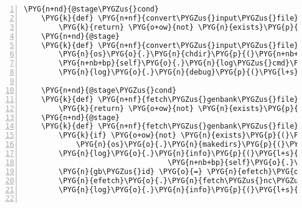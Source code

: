 \begin{Verbatim}[commandchars=\\\{\},numbers=left,firstnumber=1,stepnumber=5]
    \PYG{n+nd}{@stage\PYGZus{}cond}
    \PYG{k}{def} \PYG{n+nf}{convert\PYGZus{}input\PYGZus{}file}\PYG{p}{(}\PYG{n+nb+bp}{self}\PYG{p}{)}\PYG{p}{:}
        \PYG{k}{return} \PYG{o+ow}{not} \PYG{n}{exists}\PYG{p}{(}\PYG{n+nb+bp}{self}\PYG{o}{.}\PYG{n}{analysis}\PYG{o}{.}\PYG{n}{inputfile\PYGZus{}fq\PYGZus{}path}\PYG{p}{)}
    \PYG{n+nd}{@stage}
    \PYG{k}{def} \PYG{n+nf}{convert\PYGZus{}input\PYGZus{}file}\PYG{p}{(}\PYG{n+nb+bp}{self}\PYG{p}{)}\PYG{p}{:}
        \PYG{n}{os}\PYG{o}{.}\PYG{n}{chdir}\PYG{p}{(}\PYG{n+nb+bp}{self}\PYG{o}{.}\PYG{n}{analysis}\PYG{o}{.}\PYG{n}{input\PYGZus{}data\PYGZus{}dir}\PYG{p}{)}
        \PYG{n+nb+bp}{self}\PYG{o}{.}\PYG{n}{log\PYGZus{}cmd}\PYG{p}{(}\PYG{l+s}{"}\PYG{l+s}{fastq-dump}\PYG{l+s}{"}\PYG{p}{,} \PYG{l+s}{"}\PYG{l+s}{-B}\PYG{l+s}{"}\PYG{p}{,} \PYG{n+nb+bp}{self}\PYG{o}{.}\PYG{n}{analysis}\PYG{o}{.}\PYG{n}{inputfile\PYGZus{}name}\PYG{p}{)}
        \PYG{n}{log}\PYG{o}{.}\PYG{n}{debug}\PYG{p}{(}\PYG{l+s}{"}\PYG{l+s}{created }\PYG{l+s+si}{\PYGZpc{}s}\PYG{l+s}{"} \PYG{o}{\PYGZpc{}} \PYG{n+nb+bp}{self}\PYG{o}{.}\PYG{n}{analysis}\PYG{o}{.}\PYG{n}{inputfile\PYGZus{}fq\PYGZus{}path}\PYG{p}{)}

    \PYG{n+nd}{@stage\PYGZus{}cond}
    \PYG{k}{def} \PYG{n+nf}{fetch\PYGZus{}genbank\PYGZus{}file}\PYG{p}{(}\PYG{n+nb+bp}{self}\PYG{p}{)}\PYG{p}{:}
        \PYG{k}{return} \PYG{o+ow}{not} \PYG{n}{exists}\PYG{p}{(}\PYG{n+nb+bp}{self}\PYG{o}{.}\PYG{n}{analysis}\PYG{o}{.}\PYG{n}{genbankfile\PYGZus{}path}\PYG{p}{)}
    \PYG{n+nd}{@stage}
    \PYG{k}{def} \PYG{n+nf}{fetch\PYGZus{}genbank\PYGZus{}file}\PYG{p}{(}\PYG{n+nb+bp}{self}\PYG{p}{)}\PYG{p}{:}
        \PYG{k}{if} \PYG{o+ow}{not} \PYG{n}{exists}\PYG{p}{(}\PYG{n+nb+bp}{self}\PYG{o}{.}\PYG{n}{analysis}\PYG{o}{.}\PYG{n}{genbank\PYGZus{}data\PYGZus{}dir}\PYG{p}{)}\PYG{p}{:}
            \PYG{n}{os}\PYG{o}{.}\PYG{n}{makedirs}\PYG{p}{(}\PYG{n+nb+bp}{self}\PYG{o}{.}\PYG{n}{analysis}\PYG{o}{.}\PYG{n}{genbank\PYGZus{}data\PYGZus{}dir}\PYG{p}{)}
        \PYG{n}{log}\PYG{o}{.}\PYG{n}{info}\PYG{p}{(}\PYG{l+s}{"}\PYG{l+s}{Fetching }\PYG{l+s}{'}\PYG{l+s+si}{\PYGZpc{}s}\PYG{l+s}{'}\PYG{l+s}{ from entrez...}\PYG{l+s}{"} \PYG{o}{\PYGZpc{}}
                                 \PYG{n+nb+bp}{self}\PYG{o}{.}\PYG{n}{analysis}\PYG{o}{.}\PYG{n}{org\PYGZus{}accession}\PYG{p}{)}
        \PYG{n}{gb\PYGZus{}id} \PYG{o}{=} \PYG{n}{efetch}\PYG{o}{.}\PYG{n}{get\PYGZus{}nc\PYGZus{}id}\PYG{p}{(}\PYG{n+nb+bp}{self}\PYG{o}{.}\PYG{n}{analysis}\PYG{o}{.}\PYG{n}{org\PYGZus{}accession}\PYG{p}{)}
        \PYG{n}{efetch}\PYG{o}{.}\PYG{n}{fetch\PYGZus{}nc\PYGZus{}gb}\PYG{p}{(}\PYG{n}{gb\PYGZus{}id}\PYG{p}{,} \PYG{n+nb}{open}\PYG{p}{(}\PYG{n+nb+bp}{self}\PYG{o}{.}\PYG{n}{analysis}\PYG{o}{.}\PYG{n}{genbankfile\PYGZus{}path}\PYG{p}{,} \PYG{l+s}{"}\PYG{l+s}{w}\PYG{l+s}{"}\PYG{p}{)}\PYG{p}{)}
        \PYG{n}{log}\PYG{o}{.}\PYG{n}{info}\PYG{p}{(}\PYG{l+s}{"}\PYG{l+s}{...done}\PYG{l+s}{"}\PYG{p}{)}


\end{Verbatim}
